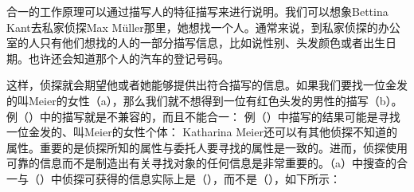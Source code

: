 合一的工作原理可以通过描写人的特征描写来进行说明。我们可以想象Bettina Kant去私家侦探Max Müller那里，她想找一个人。通常来说，到私家侦探的办公室的人只有他们想找的人的一部分描写信息，比如说性别、头发颜色或者出生日期。也许还会知道那个人的汽车的登记号码。

这样，侦探就会期望他或者她能够提供出符合描写的信息。如果我们要找一位金发的叫Meier的女性（a），那么我们就不想得到一位有红色头发的男性的描写（b）。例（）中的描写就是不兼容的，而且不能合一：
\eal
\ex\label{ex-meier-female-blonde}
\ex {}
\zl
例（）中描写的结果可能是寻找一位金发的、叫Meier的女性个体：
\ea
\label{info-detective}
\z
Katharina Meier还可以有其他侦探不知道的属性。重要的是侦探所知的属性与委托人要寻找的属性是一致的。进而，侦探使用可靠的信息而不是制造出有关寻找对象的任何信息是非常重要的。（a）中搜查的合一与（）中侦探可获得的信息实际上是（），而不是（），如下所示：
